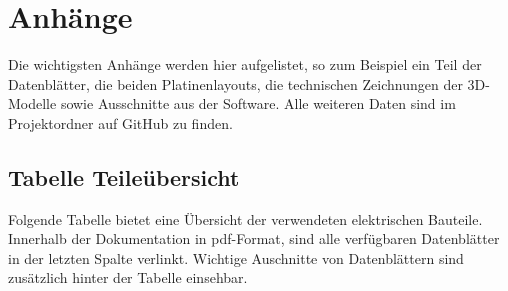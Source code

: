 \documentclass[11pt, titlepage]{report}
\begin{document}
	\chapter{Anhänge}
		Die wichtigsten Anhänge werden hier aufgelistet, so zum Beispiel ein Teil der Datenblätter, die beiden Platinenlayouts, die technischen Zeichnungen der 3D-Modelle sowie Ausschnitte aus der Software. Alle weiteren Daten sind im Projektordner auf GitHub zu finden.
		\section{Tabelle Teileübersicht}
		Folgende Tabelle bietet eine Übersicht der verwendeten elektrischen Bauteile. Innerhalb der Dokumentation in pdf-Format, sind alle verfügbaren Datenblätter in der letzten Spalte verlinkt. Wichtige Auschnitte von Datenblättern sind zusätzlich hinter der Tabelle einsehbar.
\end{document}
